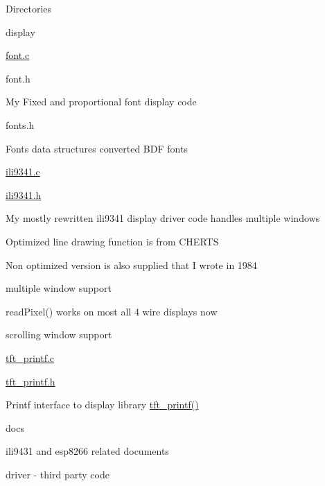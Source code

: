 \begin{DoxyParagraph}{Directories}
\begin{DoxyItemize}
\begin{DoxyItemize}
\end{DoxyItemize}
\item display
\begin{DoxyItemize}
\item \hyperlink{font_8c}{font.\+c}
\item font.\+h
\begin{DoxyItemize}
\item My Fixed and proportional font display code
\end{DoxyItemize}
\item fonts.\+h
\begin{DoxyItemize}
\item Fonts data structures converted B\+DF fonts
\end{DoxyItemize}
\item \hyperlink{ili9341_8c}{ili9341.\+c}
\item \hyperlink{ili9341_8h}{ili9341.\+h}
\begin{DoxyItemize}
\item My mostly rewritten ili9341 display driver code handles multiple windows
\begin{DoxyItemize}
\item Optimized line drawing function is from C\+H\+E\+R\+TS
\item Non optimized version is also supplied that I wrote in 1984
\item multiple window support
\item read\+Pixel() works on most all 4 wire displays now
\item scrolling window support
\end{DoxyItemize}
\end{DoxyItemize}
\item \hyperlink{tft__printf_8c}{tft\+\_\+printf.\+c}
\item \hyperlink{tft__printf_8h}{tft\+\_\+printf.\+h}
\begin{DoxyItemize}
\item Printf interface to display library \hyperlink{tft__printf_8c_ad6d6dda4facdc045d477c0cc9403e0c1}{tft\+\_\+printf()}
\end{DoxyItemize}
\end{DoxyItemize}
\item docs
\begin{DoxyItemize}
\item ili9431 and esp8266 related documents
\end{DoxyItemize}
\item driver -\/ third party code
\begin{DoxyItemize}

\end{DoxyItemize}
\end{DoxyItemize}
\end{DoxyParagraph}
